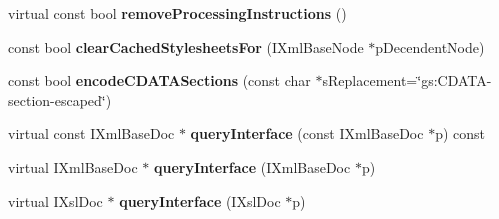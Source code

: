 \begin{DoxyCompactItemize}
\item 
\hypertarget{classgeneral__server_1_1XmlBaseDoc_a7978780879667289db092be65d02130c}{virtual const bool {\bfseries remove\-Processing\-Instructions} ()}\label{classgeneral__server_1_1XmlBaseDoc_a7978780879667289db092be65d02130c}

\item 
\hypertarget{classgeneral__server_1_1XmlBaseDoc_aacb0f20ad859deb772b5f1bd754596dd}{const bool {\bfseries clear\-Cached\-Stylesheets\-For} (\-I\-Xml\-Base\-Node $\ast$p\-Decendent\-Node)}\label{classgeneral__server_1_1XmlBaseDoc_aacb0f20ad859deb772b5f1bd754596dd}

\item 
\hypertarget{classgeneral__server_1_1XmlBaseDoc_aa21deefd3d1e349aa86b65088c36d614}{const bool {\bfseries encode\-C\-D\-A\-T\-A\-Sections} (const char $\ast$s\-Replacement=\char`\"{}gs\-:\-C\-D\-A\-T\-A-\/section-\/escaped\char`\"{})}\label{classgeneral__server_1_1XmlBaseDoc_aa21deefd3d1e349aa86b65088c36d614}

\item 
\hypertarget{classgeneral__server_1_1XmlBaseDoc_a6b4d00094bb1db838189d21f33d46922}{virtual const \-I\-Xml\-Base\-Doc $\ast$ {\bfseries query\-Interface} (const \-I\-Xml\-Base\-Doc $\ast$p) const }\label{classgeneral__server_1_1XmlBaseDoc_a6b4d00094bb1db838189d21f33d46922}

\item 
\hypertarget{classgeneral__server_1_1XmlBaseDoc_a7f7a58a20b6122f2ed22ef3b7bbbe3ee}{virtual \-I\-Xml\-Base\-Doc $\ast$ {\bfseries query\-Interface} (\-I\-Xml\-Base\-Doc $\ast$p)}\label{classgeneral__server_1_1XmlBaseDoc_a7f7a58a20b6122f2ed22ef3b7bbbe3ee}

\item 
\hypertarget{classgeneral__server_1_1XmlBaseDoc_a807c1d4a50f10333cf05d5050faf2a58}{virtual \-I\-Xsl\-Doc $\ast$ {\bfseries query\-Interface} (\-I\-Xsl\-Doc $\ast$p)}\label{classgeneral__server_1_1XmlBaseDoc_a807c1d4a50f10333cf05d5050faf2a58}

\end{DoxyCompactItemize}
